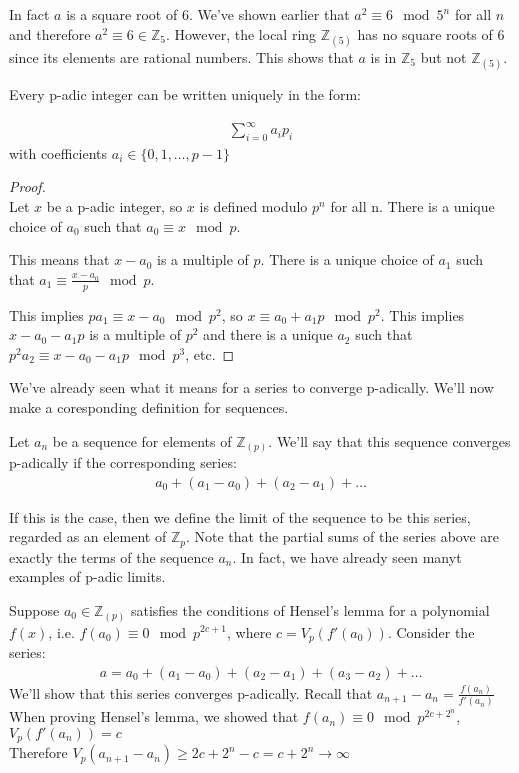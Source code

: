 \documentclass[11pt]{article}
\begin{document}
In fact $a$ is a square root of 6. We've shown earlier that $a^2 \equiv 6 \mod 5^n$ for all $n$ and therefore $a^2 \equiv 6 \in \mathbb{Z}_5$. However, the local ring $\mathbb{Z}_{(5)}$ has no square roots of 6 since its elements are rational numbers. This shows that $a$ is in $\mathbb{Z}_5$ but not $\mathbb{Z}_{(5)}$.
\begin{proposition}
Every p-adic integer can be written uniquely in the form:

	\begin{align*}
	\sum^{\infty}_{i=0}a_ip_i 
	\end{align*}
with coefficients $a_i \in \{ 0,1,\dots,p-1\}$
\end{proposition}

\begin{proof} $ $\\
Let $x$ be a p-adic integer, so $x$ is defined modulo $p^n$ for all n. There is a unique choice of $a_0$ such that $a_0 \equiv x \mod p $. 

	This means that $x-a_0$ is a multiple of $p$. There is a unique choice of $a_1$ such that $a_1 \equiv \frac{x-a_0}{p} \mod p$.

	This implies $pa_1 \equiv x-a_0 \mod p^2$, so $ x\equiv a_0 + a_1p \mod p^2$.
	This implies $x-a_0-a_1p$ is a multiple of $p^2$ and there is a unique $a_2$ such that $p^2a_2 \equiv x - a_0 -a_1p \mod p^3$, etc.
\end{proof}

We've already seen what it means for a series to converge p-adically. We'll now make a coresponding definition for sequences.

\begin{definition}
	Let $a_n$ be a sequence for elements of $\mathbb{Z}_{(p)}$. We'll say that this sequence converges p-adically if the corresponding series:
	\begin{align*}
	a_0 + (a_1 - a_0) + (a_2-a_1) + \dots
	\end{align*}
\end{definition}
	
	If this is the case, then we define the limit of the sequence to be this series, regarded as an element of $\mathbb{Z}_p$. Note that the partial sums of the series above are exactly the terms of the sequence $a_n$. In fact, we have already seen manyt examples of p-adic limits.

	Suppose $a_0 \in \mathbb{Z}_{(p)} $ satisfies the conditions of Hensel's lemma for a polynomial $f(x)$, i.e. $f(a_0) \equiv 0 \mod p^{2c+1}$, where $c = V_p(f'(a_0))$. Consider the series:
	\begin{align*}
	a =a_0+ (a_1-a_0) + (a_2-a_1)+(a_3-a_2)+\dots
	\end{align*}
	We'll show that this series converges p-adically. Recall that $a_{n+1} - a_n = \frac{f(a_n)}{f'(a_n)} $
	\newpage
When proving Hensel's lemma, we showed that $f(a_n) \equiv 0 \mod p^{2c+2^n}$, $V_p(f'(a_n)) = c$\\[1em]
	Therefore $V_p(a_{n+1} - a_n) \geq 2c + 2^n - c = c+ 2^n \rightarrow \infty $\\[1em]
\end{document}

